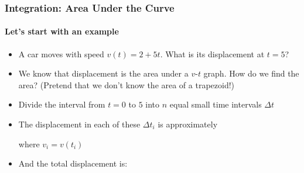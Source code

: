 \documentclass[12pt,compress,aspectratio=169]{beamer}
\begin{document}
\begin{frame}
  \frametitle{Integration: Area Under the Curve}
  \framesubtitle{Let's start with an example}
  \begin{itemize}
  \item A car moves with speed $v(t)=2+5t$. What is its displacement at $t=5$?
  \item We know that displacement is the area under a $v$-$t$ graph. How do we
    find the area? (Pretend that we don't know the area of a trapezoid!)
  \item Divide the interval from $t=0$ to $5$ into $n$ equal small time
    intervals $\Delta t$
  \item The displacement in each of these $\Delta t_i$ is approximately
    
    \vspace{-.2in}{\large
      \begin{displaymath}
        \Delta s_i = v_i\Delta t
      \end{displaymath}
    }
    
    \vspace{-.3in}where $v_i=v(t_i)$
  \item And the total displacement is:

  \end{itemize}
\end{frame}
\end{document}
